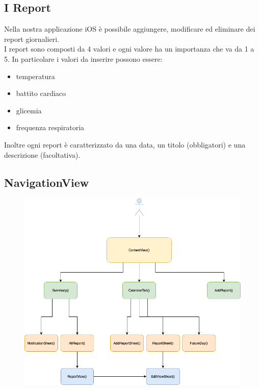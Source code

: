 \documentclass{article}
\begin{document}
\medskip

\subsection{I Report}

Nella nostra applicazione iOS è possibile aggiungere, modificare ed eliminare dei report giornalieri. \\
I report sono composti da 4 valori e ogni valore ha un importanza che va da 1 a 5. In particolare i valori da inserire possono essere: 
\begin{itemize}
  \item temperatura
  \item battito cardiaco
  \item glicemia
  \item frequenza respiratoria
\end{itemize}

Inoltre ogni report è caratterizzato da una data, un titolo (obbligatori) e una descrizione (facoltativa). 

\subsection{NavigationView}

\begin{figure}[htp]

\centering
\includegraphics[width=1.1\textwidth]{img/NavigationView.png}\
\label{fig:figure0}

\end{figure}
\end{document}
